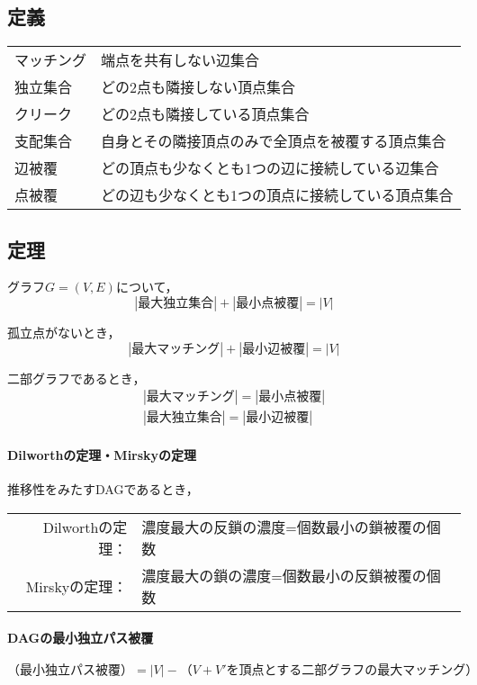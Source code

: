 \documentclass[landscape,twocolumn,9pt]{jsarticle}
\begin{document}
\subsection{定義}
\begin{table}[h]
\begin{tabular}{ll}
マッチング &端点を共有しない辺集合 \\
独立集合   &どの2点も隣接しない頂点集合 \\
クリーク   &どの2点も隣接している頂点集合 \\
支配集合   &自身とその隣接頂点のみで全頂点を被覆する頂点集合 \\
辺被覆     &どの頂点も少なくとも1つの辺に接続している辺集合 \\
点被覆     &どの辺も少なくとも1つの頂点に接続している頂点集合 \\
\end{tabular}
\end{table}

\subsection{定理}
グラフ$G=(V,E)$について，
\[ |最大独立集合|+|最小点被覆|=|V| \]

孤立点がないとき，
\[ |最大マッチング|+|最小辺被覆|=|V| \]

二部グラフであるとき，
\begin{align*}
|最大マッチング|=|最小点被覆| \\
  |最大独立集合|=|最小辺被覆|
\end{align*}

\paragraph{Dilworthの定理・Mirskyの定理\\}\indent
推移性をみたすDAGであるとき，
\begin{center}\tabcolsep=0mm
\begin{tabular}{rl}
Dilworthの定理： &濃度最大の反鎖の濃度=個数最小の鎖被覆の個数 \\
Mirskyの定理：   &濃度最大の鎖の濃度=個数最小の反鎖被覆の個数
\end{tabular}
\end{center}

\paragraph{DAGの最小独立パス被覆}
\[ \text{（最小独立パス被覆）}=|V|-\text{（$V+V'$を頂点とする二部グラフの最大マッチング）} \]
\end{document}
